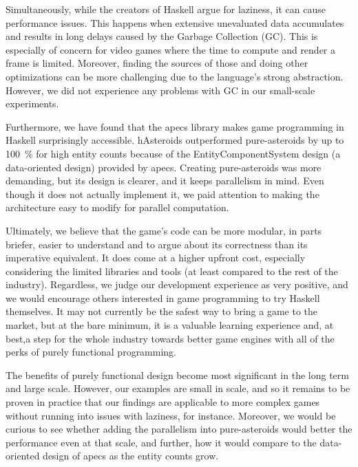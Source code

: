 \documentclass[
  digital, %
  color,   %
  table,   %
  oneside, %
  lof,     %
  lot,     %
]{fithesis3}
\begin{document}
{Simultaneously, while the creators of Haskell argue for laziness, it can cause performance issues.
This happens when extensive unevaluated data accumulates and results in long delays caused
by the Garbage Collection (GC). This is especially of concern for video games where the time to
compute and render a frame is limited. Moreover, finding the sources of those 
and doing other optimizations can be more challenging due to the language's strong abstraction.
However, we did not experience any problems with GC in our small-scale experiments.

Furthermore, we have found that the apecs library makes game programming in Haskell surprisingly
accessible. hAsteroids outperformed pure-asteroids by up to 100~\% for high entity counts
because of the Entity\textendash{}Component\textendash{}System design (a data-oriented design)
provided by apecs.
Creating pure-asteroids was more demanding, but its design is clearer, and it keeps
parallelism in mind. Even though it does not actually implement it, we paid attention
to making the architecture easy to modify for parallel computation.

Ultimately, we believe that the game's code can be more modular, in parts briefer,
easier to understand and to argue about its correctness than its imperative equivalent.
It does come at a higher upfront cost, especially considering the limited libraries and tools
(at least compared to the rest of the industry).
Regardless, we judge our development experience as very positive, and we would encourage others
interested in game programming to try Haskell themselves.
It may not currently be the safest way to bring a game to the market,
but at the bare minimum, it is a valuable learning experience and, at best,a step for the whole industry
towards better game engines with all of the perks of purely functional programming.

The benefits of purely functional design become most significant in the long term and large scale.
However, our examples are small in scale, and so it remains to be proven
in practice that our findings are applicable to more complex games
without running into issues with laziness, for instance.
Moreover, we would be curious to see whether adding the parallelism into pure-asteroids
would better the performance even at that scale, and further,
how it would compare to the data-oriented design of apecs as the entity counts grow.





}
\end{document}
